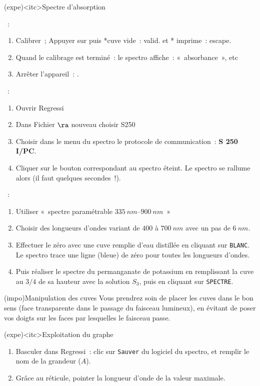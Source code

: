 \documentclass[../main/main.tex]{subfiles}
\begin{document}
{	\begin{tcb}(expe)<itc>{Spectre d'absorption}
		\begin{itemize}
			~:
			\begin{enumerate}
				\item Calibrer~; Appuyer sur  puis   *cuve vide~: valid. et *
				      imprime~: escape.
				\item Quand le calibrage est terminé~: le spectro affiche~:
				      «~absorbance~», etc
				\item Arrêter l'appareil~: .
			\end{enumerate}
			~:
			\begin{enumerate}
				\item Ouvrir Regressi
				\item Dans Fichier $\ra$ nouveau choisir S250
				\item Choisir dans le menu du spectro le protocole de communication~:
				      \textbf{S 250 I/PC}.
				\item Cliquer sur le bouton correspondant au spectro éteint. Le spectro se
				      rallume alors (il faut quelques secondes~!).
			\end{enumerate}
			~:
			\begin{enumerate}
				\item Utiliser «~spectre paramétrable $\SIrange{335}{900}{nm}$~»
				\item Choisir des longueurs d'ondes variant de $400$ à $\SI{700}{nm}$ avec
				      un pas de $\SI{6}{nm}$.
				\item Effectuer le zéro avec une cuve remplie d'eau distillée en cliquant
				      sur \texttt{BLANC}. Le spectro trace une ligne (bleue) de zéro pour
				      toutes les longueurs d'ondes.
				\item Puis réaliser le spectre du permanganate de potassium en remplissant
				      la cuve au $3/4$ de sa hauteur avec la solution $S_3$, puis en
				      cliquant sur \texttt{SPECTRE}.
			\end{enumerate}
		\end{itemize}
	\end{tcb}

	\begin{tcb}(impo){Manipulation des cuves}
		Vous prendrez soin de placer les cuves dans le bon sens (face transparente
		dans le passage du faisceau lumineux), en évitant de poser vos doigts sur les
		faces par lesquelles le faisceau passe.
	\end{tcb}

	\begin{tcb}(expe)<itc>{Exploitation du graphe}
		\begin{enumerate}
			\item Basculer dans Regressi~: clic sur \texttt{Sauver} du logiciel
			      du spectro, et remplir le nom de la grandeur ($A$).
			\item Grâce au réticule, pointer la longueur d'onde de la valeur maximale.
		\end{enumerate}
	\end{tcb}
}
\end{document}
